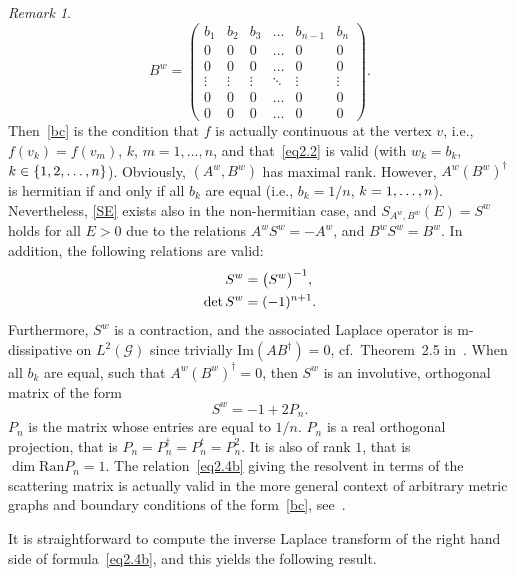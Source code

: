 \documentclass[11pt,a4paper]{amsart}
\newcommand{\cG}{\mathcal{G}}
\newcommand{\1}{1}
\theoremstyle{remark}
\newtheorem{remark}[theorem]{Remark}
\newcommand{\sn}{\ensuremath\{1,2,\dotsc,n\}}
\newcommand{\kn}{\ensuremath k=1,\dotsc,n}
\newcommand{\SW}{\ensuremath S^w}
\numberwithin{equation}{section}
\begin{document}
\begin{remark}
\begin{equation*}
    B^w=\begin{pmatrix}
            b_1&b_2&b_3&\ldots&b_{n-1}&b_n\\
            0&0&0&\ldots&0&0\\
            0&0&0&\ldots&0&0\\
            \vdots&\vdots&\vdots&\ddots&\vdots&\vdots\\
            0&0&0&\ldots&0&0\\
            0&0&0&\ldots&0&0
        \end{pmatrix}.
\end{equation*}
Then~\eqref{bc} is the condition that $f$ is actually continuous at the vertex $v$,
i.e., $f(v_k)=f(v_m)$, $k$, $m=1,\dotsc,n$, and that~\eqref{eq2.2} is valid (with
$w_k=b_k$, $k\in\sn$). Obviously, $(A^w, B^w)$ has maximal rank. However, $A^w
(B^w)^\dagger$ is hermitian if and only if all $b_k$ are equal (i.e., $b_k = 1/n$,
$\kn$). Nevertheless, \eqref{SE} exists also in the non-hermitian case, and $S_{A^w,
B^w}(E)=S^w$ holds for all $E>0$ due to the relations $A^w S^w = - A^w$, and $B^w
S^w = B^w$. In addition, the following relations are valid:
\begin{align}
         \SW &= \bigl(\SW\bigr)^{-1}, \label{eq2.5}\\
    \det \SW &= (-1)^{n+1}.           \label{eq2.6}
\end{align}
Furthermore, $S^w$ is a contraction, and the associated Laplace operator is
m-dissipative on $L^2(\cG)$ since trivially $\text{Im}(AB^\dagger)=0$, cf.\ Theorem~2.5
in~\cite{KoPo09c}. When all $b_k$ are equal, such that $A^w(B^w)^\dag=0$, then $S^w$ is
an involutive, orthogonal matrix of the form
\begin{equation}	\label{eq2.6a}
	S^w = - \1 + 2P_n.
\end{equation}
$P_n$ is the matrix whose entries are equal to $1/n$.
$P_n$ is a real orthogonal projection, that is $P_n = P_n^\dag = P_n^t = P_n^2$.
It is also of rank $1$, that is $\dim \text{Ran} P_n = 1$.
The relation~\eqref{eq2.4b} giving the resolvent in terms of the
scattering matrix is actually valid in the more general context of arbitrary metric
graphs and boundary conditions of the form~\eqref{bc}, see~\cite{KoSc06, KoPo09c}.
\end{remark}

It is straightforward to compute the inverse Laplace transform of the right hand side
of formula~\eqref{eq2.4b}, and this yields the following result.
\end{document}
